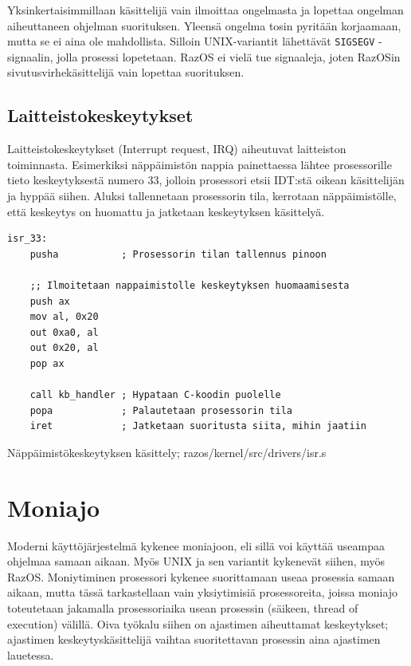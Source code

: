 \par

Yksinkertaisimmillaan käsittelijä vain ilmoittaa ongelmasta ja lopettaa ongelman aiheuttaneen ohjelman suorituksen. Yleensä ongelma tosin pyritään korjaamaan, mutta se ei aina ole mahdollista. Silloin UNIX-variantit lähettävät \texttt{SIGSEGV} -signaalin, jolla prosessi lopetetaan. RazOS ei vielä tue signaaleja, joten RazOSin sivutusvirhekäsittelijä vain lopettaa suorituksen.

\subsection{Laitteistokeskeytykset}

Laitteistokeskeytykset (Interrupt request, IRQ) aiheutuvat laitteiston toiminnasta. Esimerkiksi näppäimistön nappia painettaessa lähtee prosessorille tieto keskeytyksestä numero 33, jolloin prosessori etsii IDT:stä oikean käsittelijän ja hyppää siihen. Aluksi tallennetaan prosessorin tila, kerrotaan näppäimistölle, että keskeytys on huomattu ja jatketaan keskeytyksen käsittelyä.

\begin{listing}[H]
\begin{verbatim}
isr_33:
    pusha           ; Prosessorin tilan tallennus pinoon

    ;; Ilmoitetaan nappaimistolle keskeytyksen huomaamisesta
    push ax
    mov al, 0x20
    out 0xa0, al
    out 0x20, al
    pop ax

    call kb_handler ; Hypataan C-koodin puolelle
    popa            ; Palautetaan prosessorin tila
    iret            ; Jatketaan suoritusta siita, mihin jaatiin
\end{verbatim}
\caption{Näppäimistökeskeytyksen käsittely; razos/kernel/src/drivers/isr.s}
\label{lst:kb_isr}
\end{listing}

\section{Moniajo}

Moderni käyttöjärjestelmä kykenee moniajoon, eli sillä voi käyttää useampaa ohjelmaa samaan aikaan. Myös UNIX ja sen variantit kykenevät siihen, myös RazOS. Moniytiminen prosessori kykenee suorittamaan useaa prosessia samaan aikaan, mutta tässä tarkastellaan vain yksiytimisiä prosessoreita, joissa moniajo toteutetaan jakamalla prosessoriaika usean prosessin (säikeen, thread of execution) välillä. Oiva työkalu siihen on ajastimen aiheuttamat keskeytykset; ajastimen keskeytyskäsittelijä vaihtaa suoritettavan prosessin aina ajastimen lauetessa.

